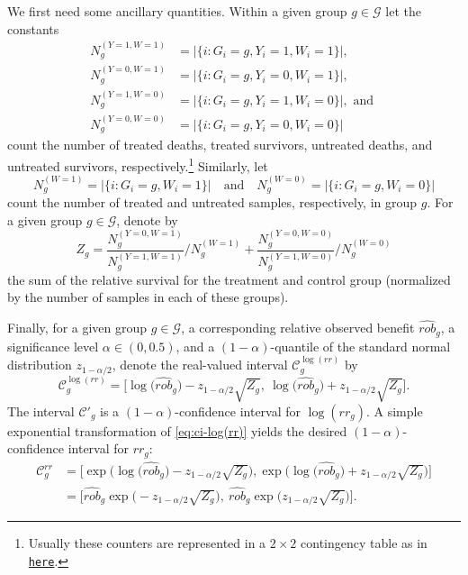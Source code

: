 \documentclass{article}
\begin{document}
We first need some ancillary quantities. Within a given group $g \in \mathcal{G}$ let the constants
\begin{equation}
\begin{split}
    N_g^{(Y=1, W=1)} &= |\{i : G_i = g, Y_i = 1, W_i = 1\}|,
    \\
    N_g^{(Y=0, W=1)} &= |\{i : G_i = g, Y_i = 0, W_i = 1\}|,
    \\
    N_g^{(Y=1, W=0)} &= |\{i : G_i = g, Y_i = 1, W_i = 0\}|, \text{ and }
    \\
    N_g^{(Y=0, W=0)} &= |\{i : G_i = g, Y_i = 0, W_i = 0\}|
\end{split}
\end{equation}
count the number of treated deaths, treated survivors, untreated deaths, and untreated survivors, respectively.\footnote{Usually these counters are represented in a $2 \times 2$ contingency table as in \href{https://www.ncbi.nlm.nih.gov/pmc/articles/PMC2938757/}{\texttt{here}}.} Similarly, let
\begin{equation}
    N_g^{(W=1)} = |\{i : G_i = g, W_i = 1\}|
    \quad \text{and} \quad 
    N_g^{(W=0)} = |\{i : G_i = g, W_i = 0\}|
\end{equation}
count the number of treated and untreated samples, respectively, in group $g$. For a given group $g \in \mathcal{G}$, denote by 
\begin{equation}
    Z_g 
    =
    \frac{N_g^{(Y=0, W=1)}}{N_g^{(Y=1, W=1)}}
    \bigg/ N_g^{(W=1)}
    +
    \frac{N_g^{(Y=0, W=0)}}{N_g^{(Y=1, W=0)}}
    \bigg/ N_g^{(W=0)}
\end{equation}
the sum of the relative survival for the treatment and control group (normalized by the number of samples in each of these groups). 

Finally, for a given group $g \in \mathcal{G}$, a corresponding relative observed benefit $\widehat{rob}_g$, a significance level $\alpha \in (0,0.5)$, and a $(1-\alpha)$-quantile of the standard normal distribution $z_{1-\alpha / 2}$, denote the real-valued interval $\mathcal{C}^{\log(rr)}_g$ by 
\begin{equation}
    \mathcal{C}^{\log(rr)}_g
    =
    \Big[
    \log \big( \widehat{rob}_g\big) - z_{1-\alpha / 2} \sqrt{Z_g},\ 
    \log \big( \widehat{rob}_g\big) + z_{1-\alpha / 2} \sqrt{Z_g}
    \Big].
\label{eq:ci-log(rr)}
\end{equation}
The interval $\mathcal{C}'_g$ is a $(1-\alpha)$-confidence interval for $\log(rr_g)$. A simple exponential transformation of \eqref{eq:ci-log(rr)} yields the desired $(1-\alpha)$-confidence interval for $rr_g$:
\begin{equation}
\begin{split}
    \mathcal{C}_g^{rr}
    &=
    \Bigg[ 
    \exp\Big( \log \big( \widehat{rob}_g\big) - z_{1-\alpha / 2} \sqrt{Z_g} \Big),
    \exp\Big( \log \big( \widehat{rob}_g\big) + z_{1-\alpha / 2} \sqrt{Z_g} \Big)
    \Bigg]
    \\
    &=
   \Bigg[ 
   \widehat{rob}_g 
   \exp \Big(
   - z_{1-\alpha / 2} \sqrt{Z_g} \Big),\ 
   \widehat{rob}_g 
   \exp \Big(
    z_{1-\alpha / 2} \sqrt{Z_g} \Big)
    \Bigg].
\end{split}
\end{equation}
\end{document}
